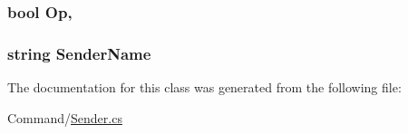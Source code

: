 \subsubsection[{Op}]{\setlength{\rightskip}{0pt plus 5cm}bool Op\hspace{0.3cm}{\ttfamily [get]}, {\ttfamily [set]}}\label{classOTA_1_1Command_1_1WorldSender_a21ba9f1622dc7475d067844accea3cf6}
\hypertarget{classOTA_1_1Command_1_1WorldSender_a8435cbd7a4dda595164d4ff47d4f4525}{}
\subsubsection[{Sender\+Name}]{\setlength{\rightskip}{0pt plus 5cm}string Sender\+Name\hspace{0.3cm}{\ttfamily [get]}}\label{classOTA_1_1Command_1_1WorldSender_a8435cbd7a4dda595164d4ff47d4f4525}


The documentation for this class was generated from the following file\+:\begin{DoxyCompactItemize}
\item 
Command/\hyperlink{Sender_8cs}{Sender.\+cs}\end{DoxyCompactItemize}
